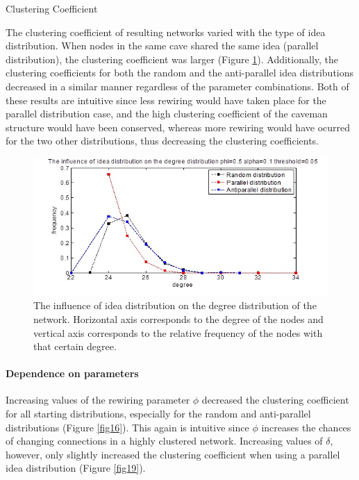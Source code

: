 \documentclass{beamer}
\begin{document}
%
\begin{frame}
{Clustering Coefficient}

The clustering coefficient of resulting networks varied with the type of idea distribution. When nodes in the same cave shared the same idea (parallel distribution), the clustering coefficient was larger (Figure \ref{fig10}). Additionally, the clustering coefficients for both the random and the anti-parallel idea distributions decreased in a similar manner regardless of the parameter combinations. Both of these results are intuitive since less rewiring would have taken place for the parallel distribution case, and the high clustering coefficient of the caveman structure would have been conserved, whereas more rewiring would have ocurred for the two other distributions, thus decreasing the clustering coefficients.

\begin{figure}
[htp]
\begin{center}
\includegraphics{Fig10}
\end{center}
\caption{ The influence of idea distribution on the degree distribution of the network. Horizontal axis corresponds to the degree of the nodes and vertical axis corresponds to the relative frequency of the nodes with that certain degree.   }
\label {fig10}
\end{figure}

\paragraph{Dependence on parameters}
Increasing values of the rewiring parameter $\phi$ decreased the clustering coefficient for all starting distributions, especially for the random and anti-parallel distributions (Figure \ref{fig16}). This again is intuitive since $\phi$ increases the chances of changing connections in a highly clustered network.
Increasing values of $\delta$, however, only slightly increased the clustering coefficient when using a parallel idea distribution (Figure \ref{fig19}). 


\end{frame}
\end{document}
